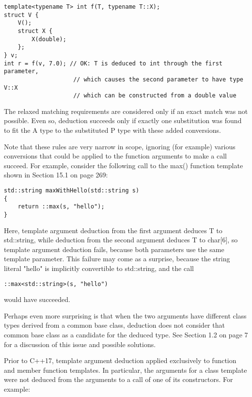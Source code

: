 \begin{lstlisting}[style=styleCXX]
template<typename T> int f(T, typename T::X);
struct V {
	V();
	struct X {
		X(double);
	};
} v;
int r = f(v, 7.0); // OK: T is deduced to int through the first parameter,
					// which causes the second parameter to have type V::X
					// which can be constructed from a double value
\end{lstlisting}

The relaxed matching requirements are considered only if an exact match was not possible. Even so, deduction succeeds only if exactly one substitution was found to fit the A type to the substituted P type with these added conversions.

Note that these rules are very narrow in scope, ignoring (for example) various conversions that could be applied to the function arguments to make a call succeed. For example, consider the following call to the max() function template shown in Section 15.1 on page 269:

\begin{lstlisting}[style=styleCXX]
std::string maxWithHello(std::string s)
{
	return ::max(s, "hello");
}
\end{lstlisting}

Here, template argument deduction from the first argument deduces T to std::string, while deduction from the second argument deduces T to char[6], so template argument deduction fails, because both parameters use the same template parameter. This failure may come as a surprise, because the string literal "hello" is implicitly convertible to std::string, and the call

\begin{lstlisting}[style=styleCXX]
::max<std::string>(s, "hello")
\end{lstlisting}

would have succeeded.

Perhaps even more surprising is that when the two arguments have different class types derived from a common base class, deduction does not consider that common base class as a candidate for the deduced type. See Section 1.2 on page 7 for a discussion of this issue and possible solutions.


Prior to C++17, template argument deduction applied exclusively to function and member function templates. In particular, the arguments for a class template were not deduced from the arguments to a call of one of its constructors. For example:

